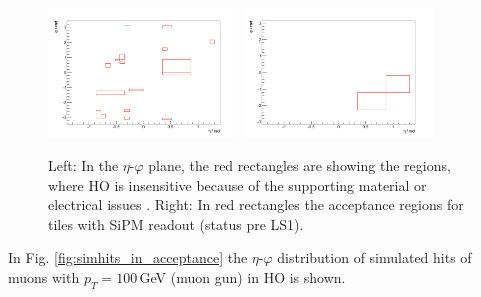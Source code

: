 			\begin{figure}[htbp]
				\centering
				\includegraphics[width=0.45\textwidth]{Figures/erdogan/deadregions.png}
				\includegraphics[width=0.45\textwidth]{Figures/erdogan/sipmregions.png}
				\caption{Left: In the $\eta$-$\varphi$ plane, the red rectangles are showing the regions, where HO is insensitive because of the supporting material or electrical issues \cite{JINST}. Right: In
				red rectangles the acceptance regions for tiles with SiPM readout (status pre LS1).}
				\label{fig:ho_acceptance}
			\end{figure}
			In Fig. \ref{fig:simhits_in_acceptance} the $\eta$-$\varphi$ distribution of simulated hits of muons with $p_T = 100$\,GeV (muon gun) in HO is shown.
